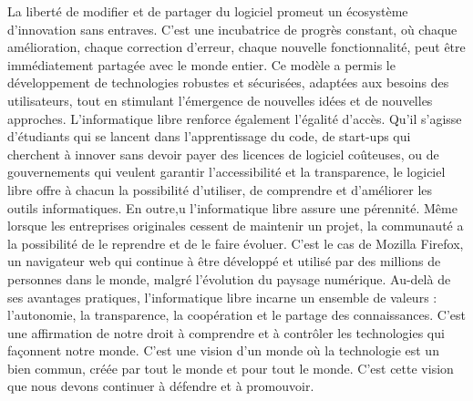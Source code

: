 La liberté de modifier et de partager du logiciel promeut un écosystème d'innovation sans entraves. C'est une incubatrice de progrès constant, où chaque amélioration, chaque correction d'erreur, chaque nouvelle fonctionnalité, peut être immédiatement partagée avec le monde entier. Ce modèle a permis le développement de technologies robustes et sécurisées, adaptées aux besoins des utilisateurs, tout en stimulant l'émergence de nouvelles idées et de nouvelles approches.
L'informatique libre renforce également l'égalité d'accès. Qu'il s'agisse d'étudiants qui se lancent dans l'apprentissage du code, de start-ups qui cherchent à innover sans devoir payer des licences de logiciel coûteuses, ou de gouvernements qui veulent garantir l'accessibilité et la transparence, le logiciel libre offre à chacun la possibilité d'utiliser, de comprendre et d'améliorer les outils informatiques.
En outre,u l'informatique libre assure une pérennité. Même lorsque les entreprises originales cessent de maintenir un projet, la communauté a la possibilité de le reprendre et de le faire évoluer. C'est le cas de Mozilla Firefox, un navigateur web qui continue à être développé et utilisé par des millions de personnes dans le monde, malgré l'évolution du paysage numérique.
Au-delà de ses avantages pratiques, l'informatique libre incarne un ensemble de valeurs : l'autonomie, la transparence, la coopération et le partage des connaissances. C'est une affirmation de notre droit à comprendre et à contrôler les technologies qui façonnent notre monde. C'est une vision d'un monde où la technologie est un bien commun, créée par tout le monde et pour tout le monde. C'est cette vision que nous devons continuer à défendre et à promouvoir.


